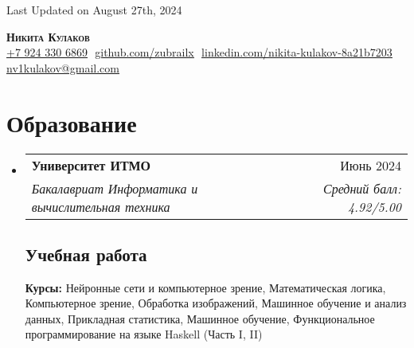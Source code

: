 \documentclass[letterpaper,11pt]{article}
\makeatletter
\newcommand{\resumeSubheading}[4]{
  \vspace{-2pt}\item
    \begin{tabular*}{0.97\textwidth}[t]{l@{\extracolsep{\fill}}r}
      \textbf{#1} & #2 \\
      \textit{\small#3} & \textit{\small #4} \\
    \end{tabular*}\vspace{-7pt}
}
\newcommand{\resumeSubHeadingListStart}{\begin{itemize}[leftmargin=0.15in, label={}]}
\newcommand{\resumeSubHeadingListEnd}{\end{itemize}}
\makeatother
\begin{document}
\begin{flushright}
  \vspace{-4pt}
  \color{gray}
  \item
  Last Updated on August 27th, 2024
\end{flushright}

\vspace{-7pt}

\begin{center}
    \textbf{\huge \scshape Никита Кулаков} \\ \vspace{8pt}
    \small 
    \href{tel:79243306869}{\underline{+7 924 330 6869}} $  $
    \href{https://github.com/zubrailx}{\underline{github.com/zubrailx}} $  $
    \href{https://www.linkedin.com/in/nikita-kulakov-8a21b7203/}{\underline{linkedin.com/nikita-kulakov-8a21b7203}} $  $
    \href{mailto:nv1kulakov@gmail.com}
    {\underline{nv1kulakov@gmail.com}}
\end{center}

\section{Образование}
  \resumeSubHeadingListStart
  
    \resumeSubheading
      {Университет ИТМО}{Июнь 2024}
      {Бакалавриат Информатика и вычислительная техника}{Средний балл: 4.92/5.00}
      
    \subsection{Учебная работа}
      \textbf{Курсы:} Нейронные сети и компьютерное зрение, Математическая логика, Компьютерное зрение, Обработка изображений, Машинное обучение и анализ данных, Прикладная статистика, Машинное обучение, Функциональное программирование на языке Haskell (Часть I, II)\\

  \resumeSubHeadingListEnd

\end{document}
